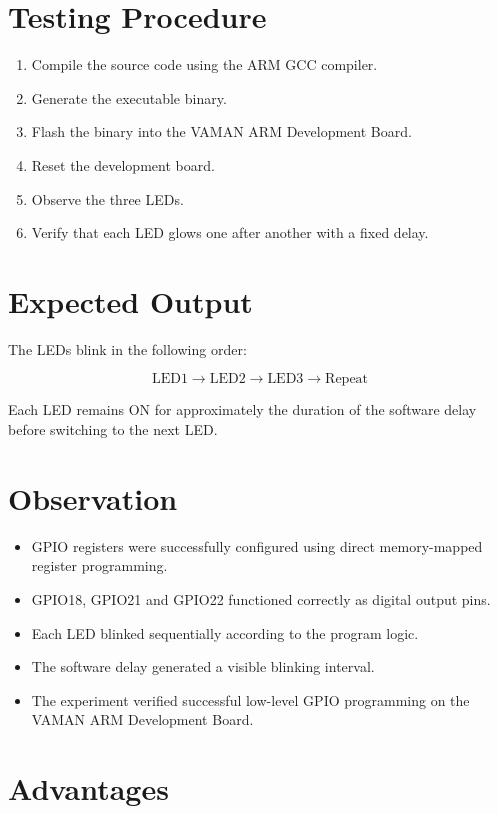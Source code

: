 \documentclass[12pt]{article}
\begin{document}
\section{Testing Procedure}

\begin{enumerate}
\item Compile the source code using the ARM GCC compiler.
\item Generate the executable binary.
\item Flash the binary into the VAMAN ARM Development Board.
\item Reset the development board.
\item Observe the three LEDs.
\item Verify that each LED glows one after another with a fixed delay.
\end{enumerate}

\section{Expected Output}

The LEDs blink in the following order:

\[
\boxed{\text{LED1} \rightarrow \text{LED2} \rightarrow \text{LED3} \rightarrow \text{Repeat}}
\]

Each LED remains ON for approximately the duration of the software delay before switching to the next LED.

\section{Observation}

\begin{itemize}
\item GPIO registers were successfully configured using direct memory-mapped register programming.
\item GPIO18, GPIO21 and GPIO22 functioned correctly as digital output pins.
\item Each LED blinked sequentially according to the program logic.
\item The software delay generated a visible blinking interval.
\item The experiment verified successful low-level GPIO programming on the VAMAN ARM Development Board.
\end{itemize}


\section{Advantages}
\end{document}
